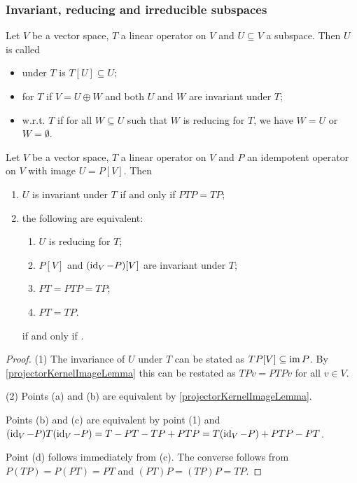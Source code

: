 \subsubsection{Invariant, reducing and irreducible subspaces}
\begin{definition}
Let $V$ be a vector space, $T$ a linear operator on $V$ and $U\subseteq V$ a subspace. Then $U$ is called
\begin{itemize}
    \item {} under $T$ is $T[U]\subseteq U$;
    \item {} for $T$ if $V = U\oplus W$ and both $U$ and $W$ are invariant under $T$;
    \item {} w.r.t. $T$ if for all $W\subseteq U$ such that $W$ is reducing for $T$, we have $W = U$ or $W = \emptyset$.
\end{itemize}
\end{definition}

\begin{lemma}
Let $V$ be a vector space, $T$ a linear operator on $V$ and $P$ an idempotent operator on $V$ with image $U = P[V]$. Then 
\begin{enumerate}
\item $U$ is invariant under $T$ \textup{if and only if} $PTP = TP$;
\item the following are equivalent:
\begin{enumerate}
\item $U$ is reducing for $T$;
\item $P[V]$ and $(\operatorname{id}_V - P)[V]$ are invariant under $T$;
\item $PT = PTP = TP$;
\item $PT = TP$.
\end{enumerate} \textup{if and only if} .
\end{enumerate}
\end{lemma}
\begin{proof}
(1) The invariance of $U$ under $T$ can be stated as $TP[V] \subseteq \operatorname{im} P$. By \ref{projectorKernelImageLemma} this can be restated as $TPv = PTPv$ for all $v\in V$.

(2) Points (a) and (b) are equivalent by \ref{projectorKernelImageLemma}.

Points (b) and (c) are equivalent by point (1) and $(\operatorname{id}_V - P)T(\operatorname{id}_V - P) = T - PT - TP + PTP = T(\operatorname{id}_V - P) + PTP - PT$.

Point (d) follows immediately from (c). The converse follows from $P(TP) = P(PT) = PT$ and $(PT)P = (TP)P = TP$.
\end{proof}

